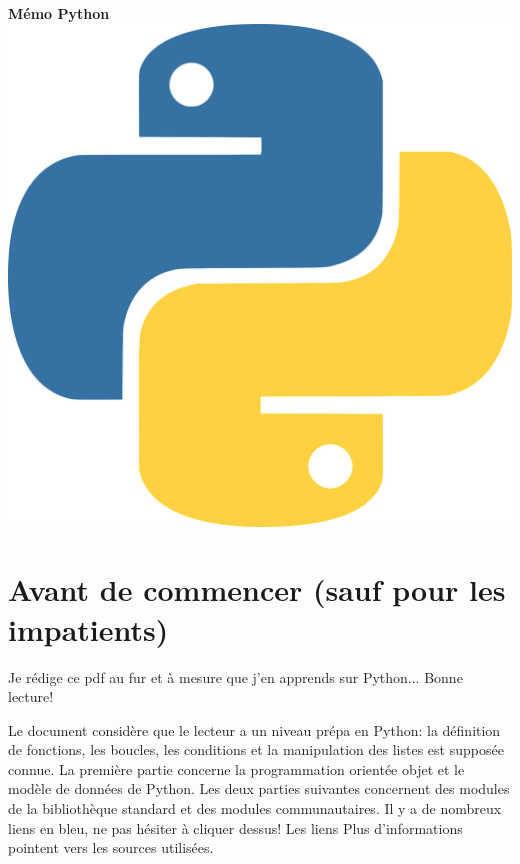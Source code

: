 \documentclass[a4paper, 10pt]{article}
\begin{document}

\begin{center}
	{\Huge{\sc\bfseries{Mémo Python}}}\\[20pt]
	\includegraphics[scale=0.07]{python.png}
	\vspace{20pt}
\end{center}

\tableofcontents

\hypersetup{linkcolor=blue}

\newpage
\section*{Avant de commencer (sauf pour les impatients)}

Je  rédige ce pdf au fur et à mesure que j'en apprends sur Python... Bonne lecture!\bigskip

Le document considère que le lecteur a un niveau \og prépa \fg{} en Python: la définition de fonctions, les boucles, les conditions et la manipulation des listes est supposée connue. La première partie concerne la programmation orientée objet et le modèle de données de Python. Les deux parties suivantes concernent des modules de la bibliothèque standard et des modules communautaires. Il y a de nombreux liens en bleu, ne pas hésiter à cliquer dessus! Les liens \og Plus d'informations \fg{}   pointent vers les sources utilisées.\bigskip
\end{document}
